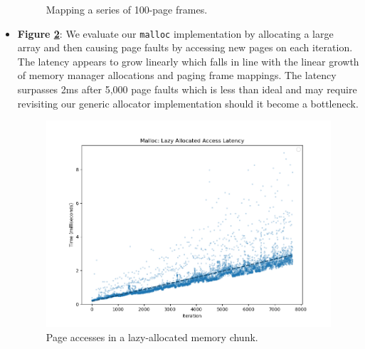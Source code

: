 \begin{itemize}[itemsep=0pt]
\begin{figure}[ht]
        \caption{Mapping a series of 100-page frames.}
        \label{figure:paging_map_large_frame_scatter}
    \end{figure}
    \item \textbf{Figure \ref{figure:malloc_scatter}}: We evaluate our \texttt{malloc} implementation by allocating a large array and then causing page faults by accessing new pages on each iteration. The latency appears to grow linearly which falls in line with the linear growth of memory manager allocations and paging frame mappings. The latency surpasses 2ms after 5,000 page faults which is less than ideal and may require revisiting our generic allocator implementation should it become a bottleneck.
    \begin{figure}[ht]
        \centering
        \includegraphics[width=0.58\columnwidth]{images/malloc_scatter.png}
        \caption{Page accesses in a lazy-allocated memory chunk.}
        \label{figure:malloc_scatter}
    \end{figure}
\end{itemize}
